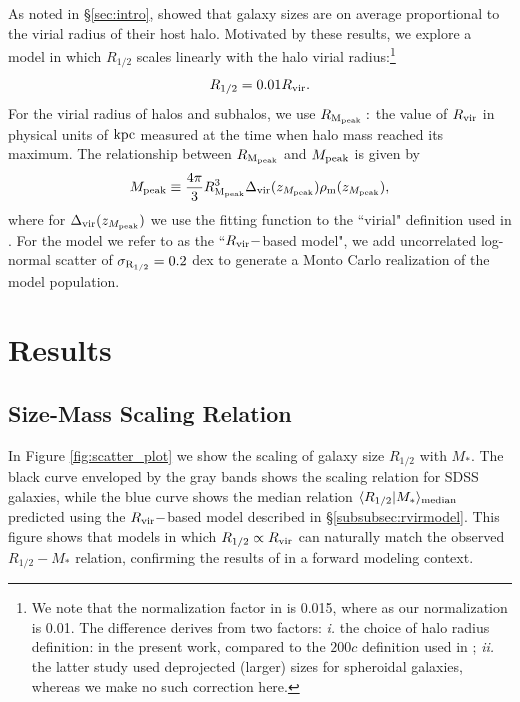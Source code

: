 \documentclass[usenatbib,usegraphicx,letterpaper]{mn2e}
\newcommand{\beq}{\begin{equation}}
\newcommand{\eeq}{\end{equation}}
\newcommand{\rhalf}{R_{1/2}}
\newcommand{\sigmarhalf}{\sigma_{\rm R_{1/2}}}
\newcommand{\mstar}{M_{\ast}}
\newcommand{\mpeak}{M_{\rm peak}}
\newcommand{\zpeak}{z_{M_{\rm peak}}}
\newcommand{\rvir}{R_{\rm vir}}
\newcommand{\rmpeak}{R_{\rm M_{peak}}}
\newcommand{\median}[2]{\langle{#1}\vert{#2}\rangle_{\rm median}}
\newcommand{\kpc}{{\rm kpc}}
\begin{document}
As noted in \S\ref{sec:intro}, \citet{kravtsov13} showed that galaxy sizes are on average proportional to the virial radius of their host halo. Motivated by these results, we  explore a model in which $\rhalf$ scales linearly with the halo virial radius:\footnote{We note that the normalization factor in \citet{kravtsov13} is 0.015, where as our normalization is 0.01. The difference derives from two factors: {\em i.} the choice of halo radius definition: \citet{bryan_norman98} in the present work, compared to the $200c$ definition used in \citet{kravtsov13}; {\em ii.} the latter study used deprojected (larger) sizes for spheroidal galaxies, whereas we make no such correction here.} 
\beq
\label{eq:fiducial_model}
\rhalf = 0.01\rvir.
\eeq
For the virial radius of halos and subhalos, we use $\rmpeak:$ the value of $\rvir$ in physical units of $\kpc$ measured at the time when halo mass reached its maximum.  The relationship between $\rmpeak$ and $\mpeak$ is given by 
\beq
\mpeak\equiv\frac{4\pi}{3}\rmpeak^{3}\Delta_{\rm vir}(\zpeak)\rho_{\rm m}(\zpeak),
\eeq
where for $\Delta_{\rm vir}(\zpeak)$ we use the fitting function to the ``virial" definition used in \citet{bryan_norman98}. For the model we refer to as the ``$\rvir-$based model", we add uncorrelated log-normal scatter of $\sigmarhalf=0.2$ dex to generate a Monto Carlo realization of the model population.

\section{Results}
\label{sec:results}

\subsection{Size-Mass Scaling Relation}
\label{subsec:one_point_function}

In Figure \ref{fig:scatter_plot} we show the scaling of galaxy size $\rhalf$ with $\mstar.$ The black curve enveloped by the gray bands shows the scaling relation for SDSS galaxies, while the blue curve shows the median relation  $\median{\rhalf}{\mstar}$ predicted using the $\rvir-$based model described in \S\ref{subsubsec:rvirmodel}. This figure shows that models in which $\rhalf\propto\rvir$ can naturally match the observed $\rhalf-\mstar$ relation, confirming the results of \citet{kravtsov13} in a forward modeling context.
\end{document}
